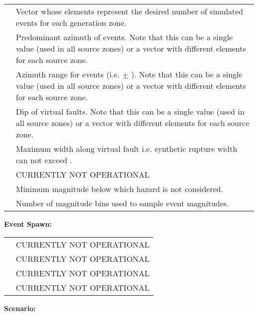 \documentclass[a4paper, 12pt]{report}
\begin{document}
\begin{supertabular}{lp{0.6\textwidth}}
  &  Vector whose elements represent the desired number of simulated events for each generation zone.   \\
 &     Predominant azimuth of events. Note that this can be a single value (used in all source zones) or a vector with different elements for each source zone.\\
   &   Azimuth range for events (i.e.  $\pm$ ). Note that this can be a single value (used in all source zones) or a vector with different elements for each source zone.  \\
 &    Dip of virtual faults.  Note that this can be a single value (used in all source zones) or a vector with different elements for each source zone.  \\
 & Maximum width along virtual fault i.e. synthetic rupture width can not exceed .\\
   & \small{CURRENTLY NOT OPERATIONAL} \\
  &  Minimum magnitude below which hazard is not considered.     \\
   &   Number of magnitude bins used to sample
event magnitudes.    \\
 \end{supertabular}


\vspace{2em} \noindent \textbf{Event Spawn:}

\begin{supertabular}{lp{0.6\textwidth}}
  &   \small{CURRENTLY NOT OPERATIONAL}  \\
 &  \small{CURRENTLY NOT OPERATIONAL} \\
 & \small{CURRENTLY NOT OPERATIONAL}  \\
 &  \small{CURRENTLY NOT OPERATIONAL} \\
 \end{supertabular}


\vspace{2em} \noindent \textbf{Scenario:}
\end{document}
